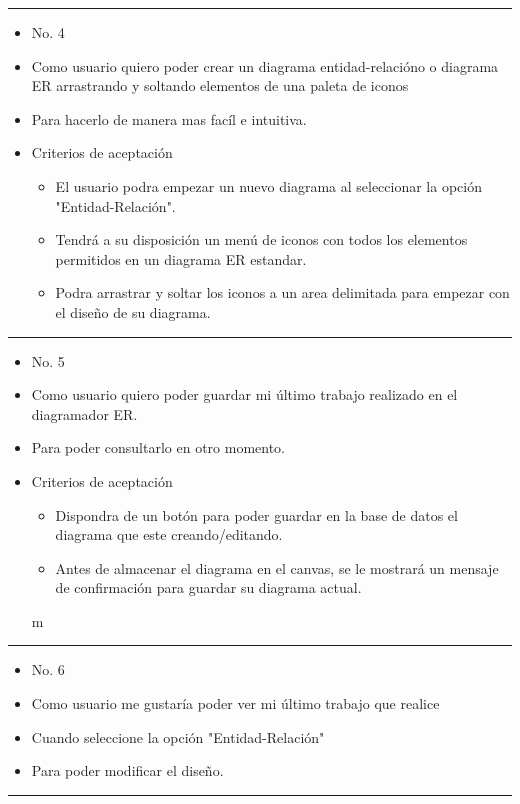 \noindent\rule{\textwidth}{1pt}
\begin{itemize}
	\item No. 4
	\item Como usuario quiero poder crear un diagrama entidad-relacióno o diagrama ER arrastrando y soltando elementos de una paleta de iconos
	\item Para hacerlo de manera mas facíl e intuitiva.
	\item Criterios de aceptación
	\begin{itemize}
		\item El usuario podra empezar un nuevo diagrama al seleccionar la opción "Entidad-Relación".
		\item Tendrá a su disposición un menú de iconos con todos los elementos permitidos en un diagrama ER estandar.
		\item Podra arrastrar y soltar los iconos a un area delimitada para empezar con el diseño de su diagrama.
	\end{itemize}
\end{itemize}
\noindent\rule{\textwidth}{1pt}
\begin{itemize}
	\item No. 5
	\item Como usuario quiero poder guardar mi último trabajo realizado en el diagramador ER.
	\item Para poder consultarlo en otro momento.
	\item Criterios de aceptación
	\begin{itemize}
		\item Dispondra de un botón para poder guardar en la base de datos el diagrama que este creando/editando.
		\item Antes de almacenar el diagrama en el canvas, se le mostrará un mensaje de confirmación para guardar su diagrama actual.
	\end{itemize}m
\end{itemize}
\noindent\rule{\textwidth}{1pt}
\begin{itemize}
	\item No. 6
	\item Como usuario me gustaría poder ver mi último trabajo que realice
	\item Cuando seleccione la opción "Entidad-Relación"
	\item Para poder modificar el diseño.
\end{itemize}
\noindent\rule{\textwidth}{1pt}
